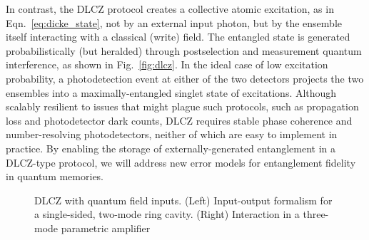 \documentclass[aps,twocolumn,secnumarabic,amsmath,amssymb,pra,groupedaddress,
showpacs, showkeys]{revtex4-1}
\begin{document}
In contrast, the DLCZ protocol creates a collective atomic excitation, as in
Eqn.~\ref{eq:dicke_state}, not by an external input photon, but by the ensemble
itself interacting with a classical (write) field. The entangled state is
generated probabilistically (but heralded) through postselection and
measurement quantum interference, as shown in Fig.~\ref{fig:dlcz}. In the ideal
case of low excitation probability, a photodetection event at either of the two
detectors projects the two ensembles into a maximally-entangled singlet state
of excitations. Although scalably resilient to issues that might plague such
protocols, such as propagation loss and photodetector dark counts, DLCZ
requires stable phase coherence and number-resolving photodetectors, neither of
which are easy to implement in practice. By enabling the storage of
externally-generated entanglement in a DLCZ-type protocol, we will address new
error models for entanglement fidelity in quantum memories.

\begin{figure}[t]
	\centering
	\resizebox{3.00in}{!}{}
	\resizebox{2.75in}{!}{}
	\caption{DLCZ with quantum field inputs. (Left) Input-output formalism for a single-sided, two-mode ring cavity. (Right) Interaction in a three-mode parametric amplifier}
	\label{fig:ours}
\end{figure}
\end{document}
